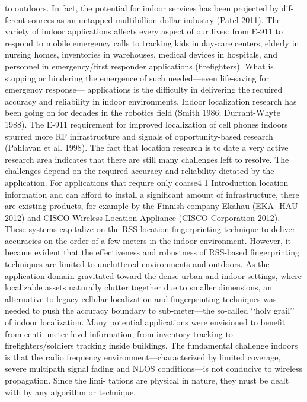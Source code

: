 to outdoors. In fact, the potential for indoor services has been projected by dif-
ferent sources as an untapped multibillion dollar industry (Patel 2011). The variety
of indoor applications affects every aspect of our lives: from E-911 to respond to
mobile emergency calls to tracking kids in day-care centers, elderly in nursing
homes, inventories in warehouses, medical devices in hospitals, and personnel in
emergency/first responder applications (firefighters). What is stopping or hindering
the emergence of such needed—even life-saving for emergency response—
applications is the difficulty in delivering the required accuracy and reliability in
indoor environments. Indoor localization research has been going on for decades
in the robotics field (Smith 1986; Durrant-Whyte 1988). The E-911 requirement
for improved localization of cell phones indoors spurred more RF infrastructure
and signals of opportunity-based research (Pahlavan et al. 1998). The fact that
location research is to date a very active research area indicates that there are still
many challenges left to resolve. The challenges depend on the required accuracy
and reliability dictated by the application. For applications that require only coarse4
1 Introduction
location information and can afford to install a significant amount of infrastructure,
there are existing products, for example by the Finnish company Ekahau (EKA-
HAU 2012) and CISCO Wireless Location Appliance (CISCO Corporation 2012).
These systems capitalize on the RSS location fingerprinting technique to deliver
accuracies on the order of a few meters in the indoor environment. However, it
became evident that the effectiveness and robustness of RSS-based fingerprinting
techniques are limited to uncluttered environments and outdoors.
As the application domain gravitated toward the dense urban and indoor settings,
where localizable assets naturally clutter together due to smaller dimensions, an
alternative to legacy cellular localization and fingerprinting techniques was needed
to push the accuracy boundary to sub-meter—the so-called ‘‘holy grail’’ of indoor
localization. Many potential applications were envisioned to benefit from centi-
meter-level information, from inventory tracking to firefighters/soldiers tracking
inside buildings. The fundamental challenge indoors is that the radio frequency
environment—characterized by limited coverage, severe multipath signal fading
and NLOS conditions—is not conducive to wireless propagation. Since the limi-
tations are physical in nature, they must be dealt with by any algorithm or technique.
